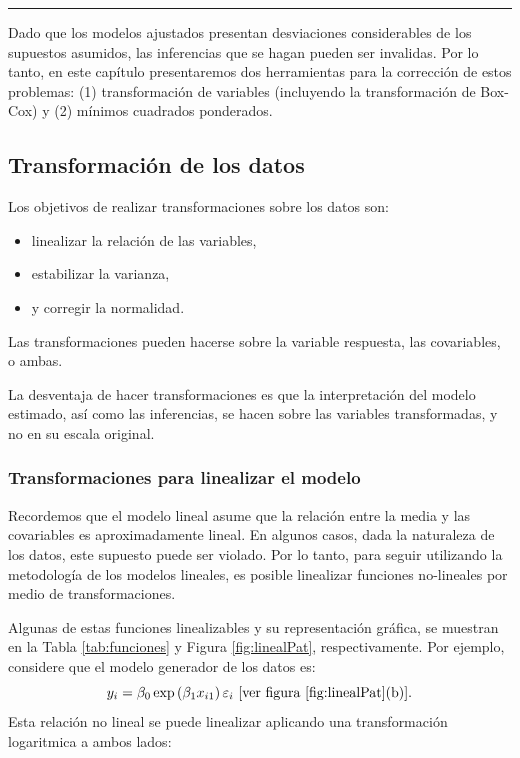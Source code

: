\documentclass[
]{article}
\providecommand{\tightlist}{%
  \setlength{\itemsep}{0pt}\setlength{\parskip}{0pt}}
\begin{document}
\rule{\textwidth}{0.4pt}

Dado que los modelos ajustados presentan desviaciones considerables de los supuestos asumidos, las inferencias que se hagan pueden ser invalidas. Por lo tanto, en este capítulo presentaremos dos herramientas para la corrección de estos problemas: (1) transformación de variables (incluyendo la transformación de Box-Cox) y (2) mínimos cuadrados ponderados.

\hypertarget{transformaciuxf3n-de-los-datos}{%
\subsection{Transformación de los datos}\label{transformaciuxf3n-de-los-datos}}

Los objetivos de realizar transformaciones sobre los datos son:

\begin{itemize}
\tightlist
\item
  linealizar la relación de las variables,
\item
  estabilizar la varianza,
\item
  y corregir la normalidad.
\end{itemize}

Las transformaciones pueden hacerse sobre la variable respuesta, las covariables, o ambas.

La desventaja de hacer transformaciones es que la interpretación del modelo estimado, así como las inferencias, se hacen sobre las variables transformadas, y no en su escala original.

\hypertarget{transformaciones-para-linealizar-el-modelo}{%
\subsubsection{Transformaciones para linealizar el modelo}\label{transformaciones-para-linealizar-el-modelo}}

Recordemos que el modelo lineal asume que la relación entre la media y las covariables es aproximadamente lineal. En algunos casos, dada la naturaleza de los datos, este supuesto puede ser violado. Por lo tanto, para seguir utilizando la metodología de los modelos lineales, es posible linealizar funciones no-lineales por medio de transformaciones.

Algunas de estas funciones linealizables y su representación gráfica, se muestran en la Tabla \ref{tab:funciones} y Figura \ref{fig:linealPat}, respectivamente. Por ejemplo, considere que el modelo generador de los datos es:
\[
y_{i} = \beta_{0}\exp\left(\beta_{1}x_{i1} \right)\varepsilon_{i} \mbox{ [ver figura \ref{fig:linealPat}(b)]}.
\]
Esta relación no lineal se puede linealizar aplicando una transformación logaritmica a ambos lados:
\end{document}
